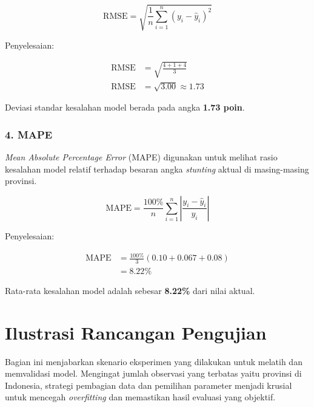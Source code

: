 \par\vspace{0.5cm}
\[
   \text{RMSE} = \sqrt{\frac{1}{n} \sum_{i=1}^{n} (y_i - \hat{y}_i)^2}
\]
\par\vspace{0.5cm}

\noindent Penyelesaian:
\par\vspace{0.2cm}
\begin{align*}
    \text{RMSE} &= \sqrt{\frac{4 + 1 + 4}{3}} \\[0.3cm]
    \text{RMSE} &= \sqrt{3.00} \approx \mathbf{1.73} 
\end{align*}
\par\vspace{0.5cm}

Deviasi standar kesalahan model berada pada angka \textbf{1.73 poin}.

\subsubsection*{4. MAPE}
\textit{Mean Absolute Percentage Error} (MAPE) digunakan untuk melihat rasio kesalahan model relatif terhadap besaran angka \textit{stunting} aktual di masing-masing provinsi.

\par\vspace{0.5cm}
\[
   \text{MAPE} = \frac{100\%}{n} \sum_{i=1}^{n} \left| \frac{y_i - \hat{y}_i}{y_i} \right|
\]
\par\vspace{0.5cm}

\noindent Penyelesaian:
\par\vspace{0.2cm}
\begin{align*}
    \text{MAPE} &= \frac{100\%}{3} (0.10 + 0.067 + 0.08) \\[0.2cm]
    &= \mathbf{8.22\%}
\end{align*}
\par\vspace{0.5cm}

Rata-rata kesalahan model adalah sebesar \textbf{8.22\%} dari nilai aktual.

\section{Ilustrasi Rancangan Pengujian} \label{sec:ilustrasi_pengujian}

Bagian ini menjabarkan skenario eksperimen yang dilakukan untuk melatih dan memvalidasi model. Mengingat jumlah observasi yang terbatas yaitu provinsi di Indonesia, strategi pembagian data dan pemilihan parameter menjadi krusial untuk mencegah \textit{overfitting} dan memastikan hasil evaluasi yang objektif.


